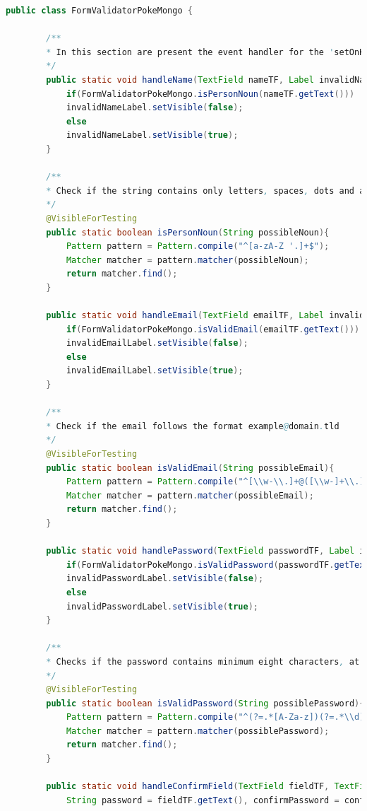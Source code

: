 \begin{lstlisting}[language=Java]
	public class FormValidatorPokeMongo {
		
		/**
		* In this section are present the event handler for the 'setOnKeyReleased' event in the form.
		*/
		public static void handleName(TextField nameTF, Label invalidNameLabel){
			if(FormValidatorPokeMongo.isPersonNoun(nameTF.getText()))
			invalidNameLabel.setVisible(false);
			else
			invalidNameLabel.setVisible(true);
		}
		
		/**
		* Check if the string contains only letters, spaces, dots and apostrophes.
		*/
		@VisibleForTesting
		public static boolean isPersonNoun(String possibleNoun){
			Pattern pattern = Pattern.compile("^[a-zA-Z '.]+$");
			Matcher matcher = pattern.matcher(possibleNoun);
			return matcher.find();
		}
		
		public static void handleEmail(TextField emailTF, Label invalidEmailLabel){
			if(FormValidatorPokeMongo.isValidEmail(emailTF.getText()))
			invalidEmailLabel.setVisible(false);
			else
			invalidEmailLabel.setVisible(true);
		}
		
		/**
		* Check if the email follows the format example@domain.tld
		*/
		@VisibleForTesting
		public static boolean isValidEmail(String possibleEmail){
			Pattern pattern = Pattern.compile("^[\\w-\\.]+@([\\w-]+\\.)+[\\w-]{2,4}$");
			Matcher matcher = pattern.matcher(possibleEmail);
			return matcher.find();
		}
		
		public static void handlePassword(TextField passwordTF, Label invalidPasswordLabel){
			if(FormValidatorPokeMongo.isValidPassword(passwordTF.getText()))
			invalidPasswordLabel.setVisible(false);
			else
			invalidPasswordLabel.setVisible(true);
		}
		
		/**
		* Checks if the password contains minimum eight characters, at least one letter and one number.
		*/
		@VisibleForTesting
		public static boolean isValidPassword(String possiblePassword){
			Pattern pattern = Pattern.compile("^(?=.*[A-Za-z])(?=.*\\d)[A-Za-z\\d]{8,}$");
			Matcher matcher = pattern.matcher(possiblePassword);
			return matcher.find();
		}
		
		public static void handleConfirmField(TextField fieldTF, TextField confirmFieldTF, Label invalidConfirmFieldLabel){
			String password = fieldTF.getText(), confirmPassword = confirmFieldTF.getText();
			

\end{lstlisting}
